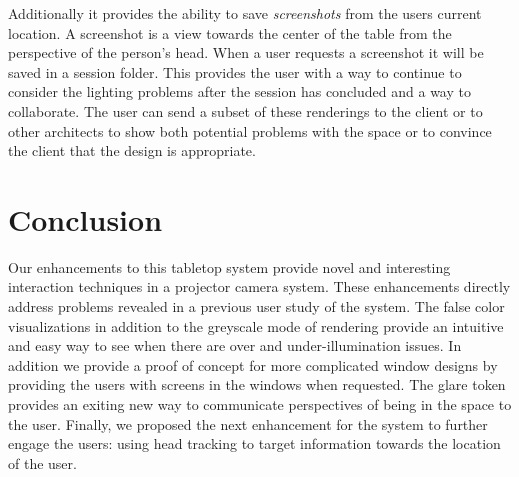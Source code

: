 \documentclass[10pt,twocolumn,letterpaper]{article}
\begin{document}
Additionally it provides the ability to save \emph{screenshots} from
the users current location.  A screenshot is a view towards the center
of the table from the perspective of the person's head.  When a user
requests a screenshot it will be saved in a session folder.  This
provides the user with a way to continue to consider the lighting
problems after the session has concluded and a way to collaborate.
The user can send a subset of these renderings to the client or to
other architects to show both potential problems with the space or to
convince the client that the design is appropriate.

\section{Conclusion}

Our enhancements to this tabletop system provide novel and interesting
interaction techniques in a projector camera system.  These
enhancements directly address problems revealed in a previous user
study of the system.  The false color visualizations in addition to
the greyscale mode of rendering provide an intuitive and easy way to
see when there are over and under-illumination issues.  In addition we provide a
proof of concept for more complicated window designs by providing the
users with screens in the windows when requested.  The glare token 
provides an exiting new way to communicate perspectives of being in the space 
to the user.
Finally, we
proposed the next enhancement for the system to further engage the
users: using head tracking to target information towards the location of the user.

\end{document}
